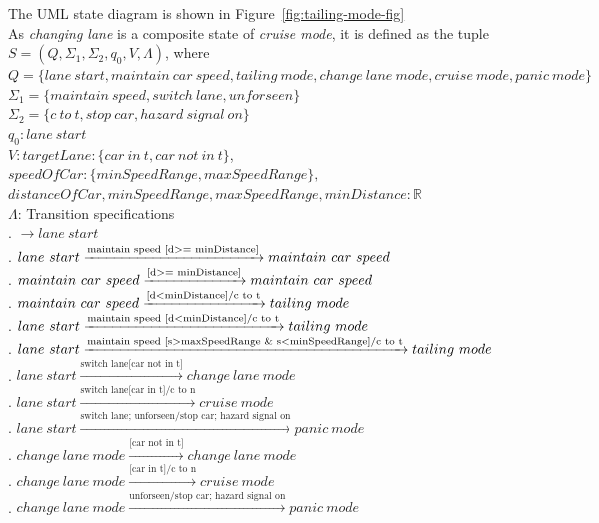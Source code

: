\documentclass[12pt]{article}
\begin{document}
\begin{spacing}{1.5}
\noindent The UML state diagram is shown in Figure~\ref{fig:tailing-mode-fig}\\


\noindent As \textit{changing lane} is a composite state of \textit{cruise mode}, it is defined as the tuple $S = (Q, \Sigma_1, \Sigma_2, q_0, V, \Lambda)$, where\\

\noindent $Q = \{lane~start, maintain~car~speed, tailing~mode, change~lane~mode, cruise~mode, panic~mode\}$\\
\noindent $\Sigma_1 = \{maintain~speed, switch~lane, unforseen\}$\\
\noindent $\Sigma_2 = \{c~to~t, stop~car, hazard~signal~on\}$\\
\noindent $q_0: lane~start$\\
\noindent $V: targetLane: \{car~in~t, car~not~in~t\}$,\\
\indent $speedOfCar: \{minSpeedRange, maxSpeedRange\},$\\
\indent $distanceOfCar, minSpeedRange, maxSpeedRange, minDistance: \mathbb{R} $\\
\noindent $\Lambda$: Transition specifications\\
. $\rightarrow lane~start$\\
. $lane~start\xrightarrow {\text{maintain speed [d\textgreater = minDistance]}} maintain~car~speed$\\
. $maintain~car~speed\xrightarrow {\text{[d\textgreater = minDistance]}} maintain~car~speed$\\
. $maintain~car~speed\xrightarrow {\text{[d\textless minDistance]/c to t}} tailing~mode$\\
. $lane~start\xrightarrow {\text{maintain speed [d\textless minDistance]/c to t}} tailing~mode$\\
. $lane~start\xrightarrow {\text{maintain speed [s\textgreater maxSpeedRange \& s\textless minSpeedRange]/c to t}} tailing~mode$\\
. $lane~start\xrightarrow {\text{switch lane[car not in t]}} change~lane~mode$\\
. $lane~start\xrightarrow {\text{switch lane[car in t]/c to n}} cruise~mode$\\
. $lane~start\xrightarrow {\text{switch lane; unforseen/stop car; hazard signal on}} panic~mode$\\
. $change~lane~mode\xrightarrow {\text{[car not in t]}} change~lane~mode$\\
. $change~lane~mode\xrightarrow {\text{[car in t]/c to n}} cruise~mode$\\
. $change~lane~mode\xrightarrow {\text{unforseen/stop car; hazard signal on}} panic~mode$\\


\end{spacing}
\end{document}
